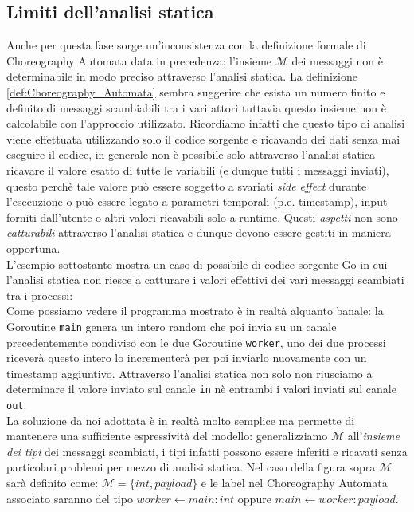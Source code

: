 \subsection{Limiti dell'analisi statica} \label{subsec:Static_Analysis_Limits}
Anche per questa fase sorge un'inconsistenza con la definizione formale di Choreography Automata data in precedenza: l'insieme $\mathcal{M}$ dei messaggi non è determinabile in modo preciso attraverso l'analisi statica. La definizione \ref{def:Choreography_Automata} sembra suggerire che esista un numero finito e definito di messaggi scambiabili tra i vari attori tuttavia questo insieme non è calcolabile con l'approccio utilizzato.
Ricordiamo infatti che questo tipo di analisi viene effettuata utilizzando solo il codice sorgente e ricavando dei dati senza mai eseguire il codice, in generale non è possibile solo attraverso l'analisi statica ricavare il valore esatto di tutte le variabili (e dunque tutti i messaggi inviati), questo perchè tale valore può essere soggetto a svariati \emph{side effect} durante l'esecuzione o può essere legato a parametri temporali (p.e. timestamp), input forniti dall'utente o altri valori ricavabili solo a runtime. Questi \emph{aspetti} non sono \emph{catturabili} attraverso l'analisi statica e dunque devono essere  gestiti in maniera opportuna. \bigskip \\
L'esempio sottostante mostra un caso di possibile di codice sorgente Go in cui l'analisi statica non riesce a catturare i valori effettivi dei vari messaggi scambiati tra i processi: \\

\bigskip
Come possiamo vedere il programma mostrato è in realtà alquanto banale: la Goroutine \texttt{main} genera un intero random che poi invia su un canale precedentemente condiviso con le due Goroutine \texttt{worker}, uno dei due processi riceverà questo intero lo incrementerà per poi inviarlo nuovamente con un timestamp aggiuntivo. Attraverso l'analisi statica non solo non riusciamo a determinare il valore inviato sul canale \texttt{in} nè entrambi i valori inviati sul canale \texttt{out}. \bigskip \\
La soluzione da noi adottata è in realtà molto semplice ma permette di mantenere una sufficiente espressività del modello: generalizziamo $\mathcal{M}$ all'\emph{insieme dei tipi} dei messaggi scambiati, i tipi infatti possono essere inferiti e ricavati senza particolari problemi per mezzo di analisi statica. Nel caso della figura sopra $\mathcal{M}$ sarà definito come: $\mathcal{M} = \{ int, payload \}$ e le label nel Choreography Automata associato saranno del tipo $worker \leftarrow main : int$ oppure $main \leftarrow worker : payload$.

